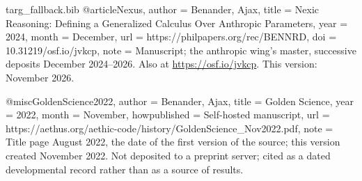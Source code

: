 \begin{filecontents}[overwrite]{targ_fallback.bib}
@article{Nexus,
  author      = {Benander, Ajax},
  title       = {Nexic Reasoning: Defining a Generalized Calculus Over Anthropic Parameters},
  year        = {2024},
  month       = {December},
  url         = {https://philpapers.org/rec/BENNRD},
  doi         = {10.31219/osf.io/jvkcp},
  note        = {Manuscript; the anthropic wing's master, successive deposits
                 December 2024--2026. Also at \url{https://osf.io/jvkcp}.
                 This version: November 2026.}
}

@misc{GoldenScience2022,
  author       = {Benander, Ajax},
  title        = {Golden Science},
  year         = {2022},
  month        = {November},
  howpublished = {Self-hosted manuscript},
  url          = {https://aethus.org/aethic-code/history/GoldenScience_Nov2022.pdf},
  note         = {Title page August 2022, the date of the first version of the source; this version created November 2022. Not deposited to a
                  preprint server; cited as a dated developmental record rather than
                  as a source of results.}
}
\end{filecontents}
